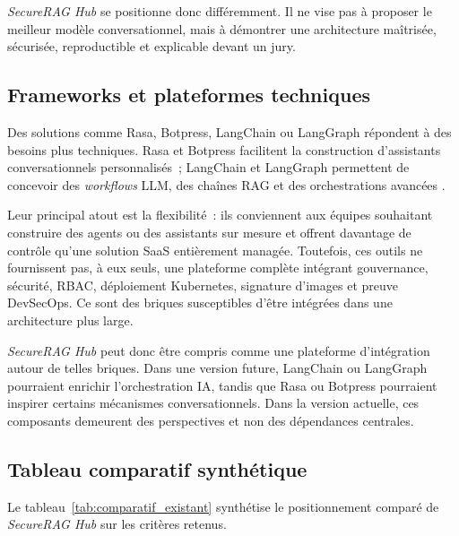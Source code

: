 \textit{SecureRAG Hub} se positionne donc différemment. Il ne vise pas à proposer le meilleur modèle conversationnel, mais à démontrer une architecture maîtrisée, sécurisée, reproductible et explicable devant un jury.

\subsection{Frameworks et plateformes techniques}

Des solutions comme Rasa, Botpress, LangChain ou LangGraph répondent à des besoins plus techniques. Rasa et Botpress facilitent la construction d'assistants conversationnels personnalisés~; LangChain et LangGraph permettent de concevoir des \textit{workflows} LLM, des chaînes RAG et des orchestrations avancées \cite{rasa_docs,botpress_docs,langchain_docs,langgraph_docs}.

Leur principal atout est la flexibilité~: ils conviennent aux équipes souhaitant construire des agents ou des assistants sur mesure et offrent davantage de contrôle qu'une solution SaaS entièrement managée. Toutefois, ces outils ne fournissent pas, à eux seuls, une plateforme complète intégrant gouvernance, sécurité, RBAC, déploiement Kubernetes, signature d'images et preuve DevSecOps. Ce sont des briques susceptibles d'être intégrées dans une architecture plus large.

\textit{SecureRAG Hub} peut donc être compris comme une plateforme d'intégration autour de telles briques. Dans une version future, LangChain ou LangGraph pourraient enrichir l'orchestration IA, tandis que Rasa ou Botpress pourraient inspirer certains mécanismes conversationnels. Dans la version actuelle, ces composants demeurent des perspectives et non des dépendances centrales.

\subsection{Tableau comparatif synthétique}

Le tableau~\ref{tab:comparatif_existant} synthétise le positionnement comparé de \textit{SecureRAG Hub} sur les critères retenus.

